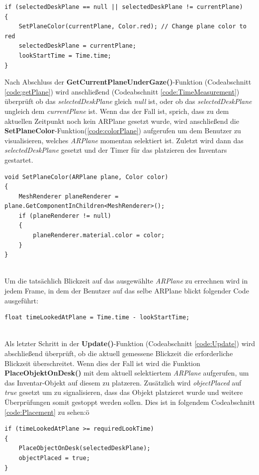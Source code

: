 \begin{lstlisting}[style=csharp, caption={Plane auswaehlen und timer starten}, label=code:TimeMeasurement]
if (selectedDeskPlane == null || selectedDeskPlane != currentPlane)
{
    SetPlaneColor(currentPlane, Color.red); // Change plane color to red
    selectedDeskPlane = currentPlane;
    lookStartTime = Time.time;
}
\end{lstlisting}
Nach Abschluss der \textbf{GetCurrentPlaneUnderGaze()}-Funktion (Codeabschnitt \ref{code:getPlane}) wird anschließend (Codeabschnitt \ref{code:TimeMeasurement})
überprüft ob das \textit{selectedDeskPlane} gleich \textit{null} ist, oder ob das \textit{selectedDeskPlane} ungleich dem
\textit{currentPlane} ist. Wenn das der Fall ist, sprich, dass zu dem aktuellen Zeitpunkt noch kein ARPlane gesetzt wurde,
wird anschließend die \textbf{SetPlaneColor}-Funktion(\ref{code:colorPlane}) aufgerufen um dem Benutzer zu visualisieren,
welches \textit{ARPlane} momentan selektiert ist. Zuletzt wird dann das \textit{selectedDeskPlane} gesetzt und der
Timer für das platzieren des Inventars gestartet.\\

\begin{lstlisting}[style=csharp, caption={Ausgewaehltes ARPlane kennzeichnen}, label=code:colorPlane]
void SetPlaneColor(ARPlane plane, Color color)
{
    MeshRenderer planeRenderer = plane.GetComponentInChildren<MeshRenderer>();
    if (planeRenderer != null)
    {
        planeRenderer.material.color = color;
    }
}
\end{lstlisting}\\

Um die tatsächlich Blickzeit auf das ausgewählte \textit{ARPlane} zu errechnen wird in jedem Frame, in dem der Benutzer
auf das selbe ARPlane blickt folgender Code ausgeführt:
\begin{lstlisting}[style=csharp, caption={Blickzeit messen}, label=code:TimeUpdate]
float timeLookedAtPlane = Time.time - lookStartTime;
\end{lstlisting}\\

Als letzter Schritt in der \textbf{Update()}-Funktion (Codeabschnitt \ref{code:Update}) wird abschließend überprüft,
ob die aktuell gemessene Blickzeit die erforderliche Blickzeit überschreitet. Wenn dies der Fall ist wird die Funktion
\textbf{PlaceObjektOnDesk()} mit dem aktuell selektiertem \textit{ARPlane} aufgerufen, um das Inventar-Objekt auf diesem
zu platzeren. Zusätzlich wird \textit{objectPlaced} auf \textit{true} gesetzt um zu signalisieren, dass das Objekt
platzieret wurde und weitere Überprüfungen somit gestoppt werden sollen. Dies ist in folgendem Codeabschnitt \ref{code:Placement}
zu sehen:ö
\begin{lstlisting}[style=csharp, caption={Platzier-Funktion aufrufen}, label=code:Placement]
if (timeLookedAtPlane >= requiredLookTime)
{
    PlaceObjectOnDesk(selectedDeskPlane);
    objectPlaced = true;
}
\end{lstlisting}\\

